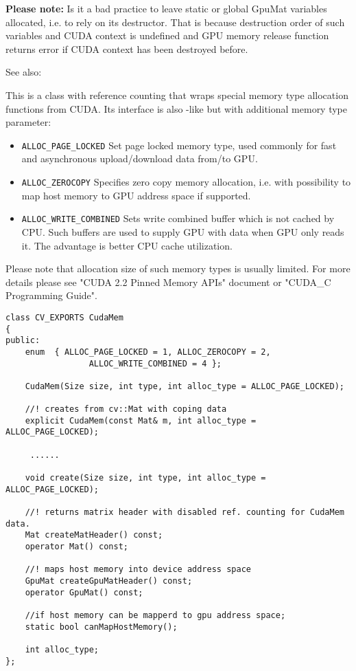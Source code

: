 \textbf{Please note:} Is it a bad practice to leave static or global GpuMat variables allocated, i.e. to rely on its destructor. That is because destruction order of such variables and CUDA context is undefined and GPU memory release function returns error if CUDA context has been destroyed before.


See also: 


This is a class with reference counting that wraps special memory type allocation functions from CUDA. Its interface is also -like but with additional memory type parameter:
\begin{itemize}
    \item \texttt{ALLOC\_PAGE\_LOCKED} Set page locked memory type, used commonly for fast and asynchronous upload/download data from/to GPU.
    \item \texttt{ALLOC\_ZEROCOPY} Specifies zero copy memory allocation, i.e. with possibility to map host memory to GPU address space if supported.
    \item \texttt{ALLOC\_WRITE\_COMBINED} Sets write combined buffer which is not cached by CPU. Such buffers are used to supply GPU with data when GPU only reads it. The advantage is better CPU cache utilization.
\end{itemize}
Please note that allocation size of such memory types is usually limited. For more details please see "CUDA 2.2 Pinned Memory APIs" document or "CUDA\_C Programming Guide".

\begin{lstlisting}
class CV_EXPORTS CudaMem
{
public:
	enum  { ALLOC_PAGE_LOCKED = 1, ALLOC_ZEROCOPY = 2,
                 ALLOC_WRITE_COMBINED = 4 };

	CudaMem(Size size, int type, int alloc_type = ALLOC_PAGE_LOCKED);

	//! creates from cv::Mat with coping data
	explicit CudaMem(const Mat& m, int alloc_type = ALLOC_PAGE_LOCKED);

	 ......

	void create(Size size, int type, int alloc_type = ALLOC_PAGE_LOCKED);

	//! returns matrix header with disabled ref. counting for CudaMem data.
	Mat createMatHeader() const;
	operator Mat() const;

	//! maps host memory into device address space
	GpuMat createGpuMatHeader() const;
	operator GpuMat() const;

	//if host memory can be mapperd to gpu address space;
	static bool canMapHostMemory();

	int alloc_type;
};

\end{lstlisting}

